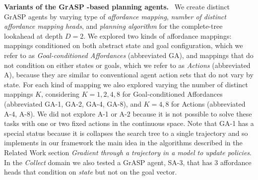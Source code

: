 \documentclass[nohyperref]{article}
\theoremstyle{plain}
\theoremstyle{definition}
\theoremstyle{remark}
\newcommand{\grasp}{{G}r{ASP} }
\renewcommand{\paragraph}[1]{\textbf{#1}\ }
\begin{document}
\paragraph{Variants of the \grasp-based planning agents.} We create distinct \grasp agents by varying type of \emph{affordance mapping}, \emph{number of distinct affordance mapping heads}, and \emph{planning algorithm} for the complete-tree lookahead at depth $D=2$.
We explored two kinds of affordance mappings: mappings conditioned on both abstract state and goal configuration, which we refer to as \emph{Goal-conditioned Affordances} (abbreviated  GA), and mappings that do not condition on either states or goals, which we refer to as \emph{Actions} (abbreviated A), because they are similar to conventional agent action sets that do not vary by state. For each kind of mapping we also explored varying the number of distinct mappings $K$, considering $K=1, 2, 4, 8$ for Goal-conditioned Affordances (abbreviated GA-1, GA-2, GA-4, GA-8), and $K= 4, 8$ for Actions (abbreviated A-4, A-8). We did not explore A-1 or A-2 because it is not possible to solve these tasks with one or two fixed actions in the continuous space. Note that GA-1 has a special status because it is collapses the search tree to a single trajectory and so implements in our framework the main idea in the algorithms described in the Related Work section \emph{Gradient through a trajectory in a model to update policies}. In the \emph{Collect} domain we also tested a 
\grasp agent, SA-3, that has $3$ affordance heads that condition on \emph{state} but not on the goal vector. 
\end{document}
